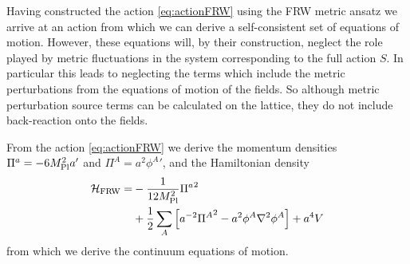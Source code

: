 Having constructed the action \eqref{eq:actionFRW} using the FRW metric ansatz we arrive at an action from which we can derive a self-consistent set of equations of motion. However, these equations will, by their construction, neglect the role played by metric fluctuations in the system corresponding to the full action $S$. In particular this leads to neglecting the terms which include the metric perturbations from the equations of motion of the fields. So although metric perturbation source terms can be calculated on the lattice, they do not include back-reaction onto the fields.

From the action \eqref{eq:actionFRW} we derive the momentum densities $\Pi^a=-6M_{\mathrm{Pl}}^2a'$ and $\Pi^A=a^2{\phi^A}'$, and the Hamiltonian density
\begin{align} \label{eq:hamFRW}
  \begin{split}
    \mathcal{H}_\mathrm{FRW} = &-\frac{1}{12M_{\mathrm{Pl}}^2}{\Pi^a}^2 \\
    &+ \frac{1}{2}\sum_A\left[ a^{-2}{\Pi^A}^2 -a^2\phi^A\nabla^2\phi^A \right] +a^4V
    \end{split}
\end{align}
from which we derive the continuum equations of motion.

